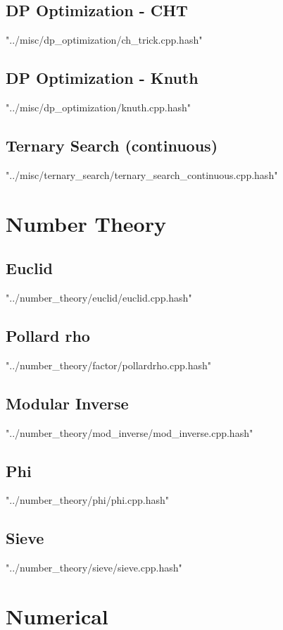 \documentclass [12pt,onecolumn,oneside]{article}
\begin{document}
\subsection{ DP Optimization - CHT}
 {"../misc/dp_optimization/ch_trick.cpp.hash"}
\subsection{ DP Optimization - Knuth}
 {"../misc/dp_optimization/knuth.cpp.hash"}
\subsection{ Ternary Search (continuous)}
 {"../misc/ternary_search/ternary_search_continuous.cpp.hash"}
\newpage

\section{Number Theory}
\subsection{ Euclid}
 {"../number_theory/euclid/euclid.cpp.hash"}
\subsection{ Pollard rho}
 {"../number_theory/factor/pollardrho.cpp.hash"}
\subsection{ Modular Inverse}
 {"../number_theory/mod_inverse/mod_inverse.cpp.hash"}
\subsection{ Phi}
 {"../number_theory/phi/phi.cpp.hash"}
\subsection{ Sieve}
 {"../number_theory/sieve/sieve.cpp.hash"}
\newpage

\section{Numerical}
\end{document}
